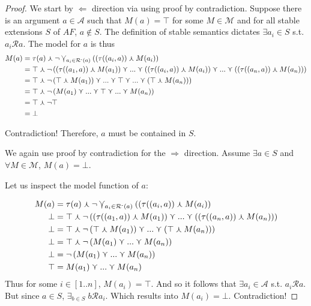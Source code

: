 \documentclass{article}
\newcommand{\args}{\mathcal{A}} %
\newcommand{\att}{\mathcal{R}}  %
\newcommand{\attackers}[1]{\att^\text{-}\left(#1\right)}
\newcommand{\modelset}{\mathcal{M}}   %
\newcommand{\tupd}{\curlywedge}
\newcommand{\tatt}{\curlyvee}
\newcommand{\Tatt}{\varcurlyvee}
\begin{document}
\begin{proof}

We start by  $\Leftarrow$ direction via using proof by contradiction. Suppose there is an argument $a \in \args$ such that $M(a) = \top$ for some $ M \in\modelset$ and for all stable extensions $S$ of $AF$,  $a \notin S$. The definition of stable semantics dictates $\exists a_{i} \in S$ s.t. $a_{i}\att{a}$. The model for $a$ is thus
\begin{align*}
M(a) &= \tau(a) \tupd \neg \Tatt_{a_i \in \attackers a} ((\tau((a_i, a)) \tupd M(a_i)) \\
     &= \top \tupd \neg \left ((\tau((a_1, a)) \tupd M(a_1)) \tatt ... \tatt  ((\tau((a_i, a)) \tupd M(a_i)) \tatt ... \tatt  ((\tau((a_n, a)) \tupd M(a_n)) \right ) \\%
     &= \top \tupd \neg \left (\top \tupd M(a_1)) \tatt ... \tatt  \top \tatt ... \tatt  (\top \tupd M(a_n)) \right ) \\
     &= \top \tupd \neg \left ( M(a_1) \tatt ... \tatt \top \tatt ... \tatt M(a_n) \right ) \\
     &= \top \tupd \neg \top \\
     &= \bot
\end{align*}

Contradiction! Therefore, $a$ must be contained in $S$.


We again use proof by contradiction for the $\Rightarrow$ direction. Assume  $\exists a \in S$ and $\forall M \in \modelset$, $ M(a) = \bot$. 

Let us inspect the model function of $a$:

\begin{align*}
M(a) &= \tau(a) \tupd \neg \Tatt_{a_i \in \attackers a} ((\tau((a_i, a)) \tupd M(a_i)) \\
\bot  &= \top \tupd \neg \left ((\tau((a_1, a)) \tupd M(a_1)) \tatt ... \tatt  ((\tau((a_n, a)) \tupd M(a_n)) \right ) \\%
\bot     &= \top \tupd \neg \left (\top \tupd M(a_1)) \tatt ...  \tatt  (\top \tupd M(a_n)) \right ) \\
\bot    &= \top \tupd \neg \left ( M(a_1) \tatt ... \tatt M(a_n) \right ) \\
\bot    &=  \neg \left ( M(a_1) \tatt ...  \tatt M(a_n) \right ) \\
\top    &=    M(a_1) \tatt ...  \tatt M(a_n) \\
\end{align*}
Thus for some $i \in[1..n]$, $M(a_i) = \top$. And so it follows that $\exists {a_i} \in \args$ s.t. $a_i\att{a}$. But since $a \in S$, $\exists_{b\in S}\; b\att{a_i}$. Which results into $M(a_i) = \bot$. Contradiction!

\end{proof}
\end{document}
